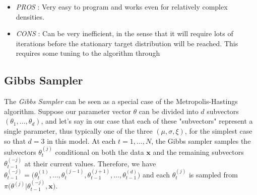 \documentclass[11pt,a4paper,openany ]{book}
\begin{document}
\begin{itemize}
	\item \emph{PROS} : Very easy to program and works even for relatively complex densities.
	\item \emph{CONS} : Can be very inefficient, in the sense that it will require lots of iterations before the stationary target distribution will be reached. This requires some tuning to the algorithm through 
\end{itemize}


\subsection{Gibbs Sampler}

The \emph{Gibbs Sampler} can be seen as a special case of the Metropolis-Hastings algorithm.
Suppose our parameter vector $\theta$ can be divided into $d$ subvectors $(\theta_1,\dots,\theta_d)$, and let's say in our case that each of these "subvectors" represent a single parameter, thus typically one of the three $(\mu,\sigma,\xi)$, for the simplest case so that $d=3$ in this model.
At each $t=1,\dots,N$, the Gibbs sampler samples the subvectors $\theta_t^{(j)}$ conditional on both the data $\boldsymbol{x}$ and the remaining subvectors $\theta_{t-1}^{(-j)}$ at their current values.
Therefore, we have $\theta_{t-1}^{(-j)}=\Big(\theta_t^{(1)},\dots,\theta_t^{(j-1)},\theta_{t-1}^{(j+1)},\dots,\theta_{t-1}^{(d)}\Big)$ and each $\theta_t^{(j)}$ is sampled from $\pi\Big(\theta^{(j)}|\theta_{t-1}^{(-j)},\boldsymbol{x}\Big)$. \\
\end{document}

